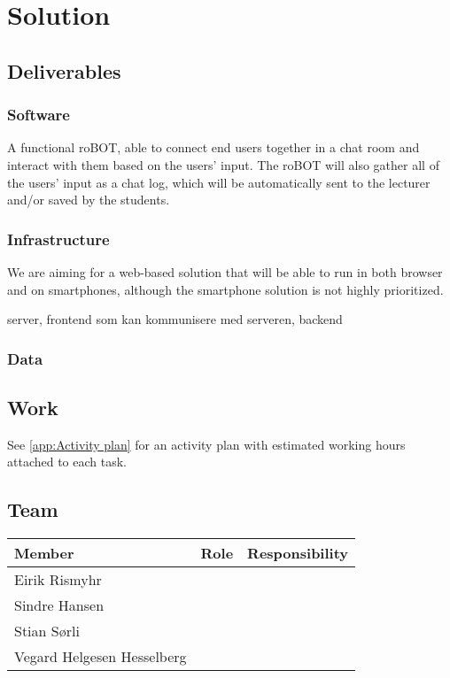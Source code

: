 \section{Solution}

\subsection{Deliverables}
\subsubsection{Software}
A functional roBOT, able to connect end users together in a chat room and interact with them based on the users' input. The roBOT will also gather all of the users' input as a chat log, which will be automatically sent to the lecturer and/or saved by the students.

\subsubsection{Infrastructure}
We are aiming for a web-based solution that will be able to run in both browser and on smartphones, although the smartphone solution is not highly prioritized. 

server, frontend som kan kommunisere med serveren, backend

\subsubsection{Data} 


\subsection{Work}
See \cref{app:Activity plan} for an activity plan with estimated working hours attached to each task. 

\subsection{Team}
\label{sec:Team}
\begin{adjustbox}{center}
\begin{tabular}{ l | c | p{0.3\paperwidth} }
    Member & Role & Responsibility \\ \hline
    Eirik Rismyhr & & \\ 
    Sindre Hansen & & \\ 
    Stian Sørli & & \\ 
    Vegard Helgesen Hesselberg & & \\ 
    
\end{tabular}
\end{adjustbox}


